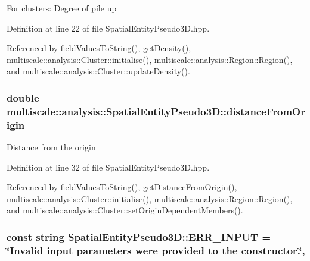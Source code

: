 For clusters\-: Degree of pile up 

Definition at line 22 of file Spatial\-Entity\-Pseudo3\-D.\-hpp.



Referenced by field\-Values\-To\-String(), get\-Density(), multiscale\-::analysis\-::\-Cluster\-::initialise(), multiscale\-::analysis\-::\-Region\-::\-Region(), and multiscale\-::analysis\-::\-Cluster\-::update\-Density().

\hypertarget{classmultiscale_1_1analysis_1_1SpatialEntityPseudo3D_a056f67b90ed41c0e6dc4df31b71ad906}{
\subsubsection[{distance\-From\-Origin}]{\setlength{\rightskip}{0pt plus 5cm}double multiscale\-::analysis\-::\-Spatial\-Entity\-Pseudo3\-D\-::distance\-From\-Origin\hspace{0.3cm}{\ttfamily [protected]}}}\label{classmultiscale_1_1analysis_1_1SpatialEntityPseudo3D_a056f67b90ed41c0e6dc4df31b71ad906}
Distance from the origin 

Definition at line 32 of file Spatial\-Entity\-Pseudo3\-D.\-hpp.



Referenced by field\-Values\-To\-String(), get\-Distance\-From\-Origin(), multiscale\-::analysis\-::\-Cluster\-::initialise(), multiscale\-::analysis\-::\-Region\-::\-Region(), and multiscale\-::analysis\-::\-Cluster\-::set\-Origin\-Dependent\-Members().

\hypertarget{classmultiscale_1_1analysis_1_1SpatialEntityPseudo3D_a5882e2e18343ccee821f1bd6b9c23724}{
\subsubsection[{E\-R\-R\-\_\-\-I\-N\-P\-U\-T}]{\setlength{\rightskip}{0pt plus 5cm}const string Spatial\-Entity\-Pseudo3\-D\-::\-E\-R\-R\-\_\-\-I\-N\-P\-U\-T = \char`\"{}Invalid input parameters were provided to the constructor.\char`\"{}\hspace{0.3cm}{\ttfamily [static]}, {\ttfamily [protected]}}}\label{classmultiscale_1_1analysis_1_1SpatialEntityPseudo3D_a5882e2e18343ccee821f1bd6b9c23724}


